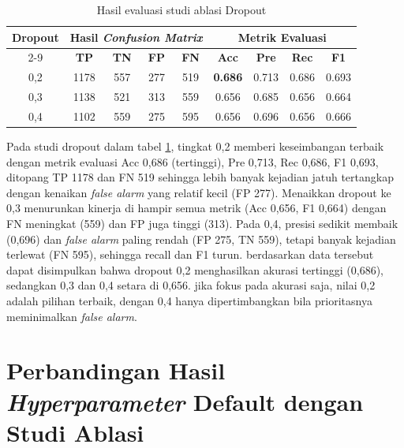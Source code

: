 \begin{table}[htbp]
    \centering
    \caption{Hasil evaluasi studi ablasi Dropout}
    \label{tab:ablasi Dropout}
    \begin{tabular}{|c|c|c|c|c|c|c|c|c|}
        \hline
        \multirow{2}{*}{\textbf{Dropout}} & \multicolumn{4}{c|}{\textbf{Hasil \textit{Confusion Matrix}}} & \multicolumn{4}{c|}{\textbf{Metrik Evaluasi}} \\ \cline{2-9}
         & \textbf{TP} & \textbf{TN} & \textbf{FP} & \textbf{FN} & \textbf{Acc} & \textbf{Pre} & \textbf{Rec} & \textbf{F1} \\ \hline
        0,2 & 1178 & 557 & 277 & 519 & \textbf{0.686} & 0.713 & 0.686 & 0.693 \\ \hline
        0,3 & 1138  & 521 & 313 & 559 & 0.656 & 0.685 & 0.656 & 0.664 \\ \hline
        0,4 & 1102 & 559 & 275 & 595 & 0.656 & 0.696 & 0.656 & 0.666 \\ \hline
    \end{tabular}
\end{table}

Pada studi dropout dalam tabel \ref{tab:ablasi Dropout}, tingkat 0,2 memberi keseimbangan terbaik dengan metrik evaluasi Acc 0,686 (tertinggi), Pre 0,713, Rec 0,686, F1 0,693, ditopang TP 1178 dan FN 519 sehingga lebih banyak kejadian jatuh tertangkap dengan kenaikan \textit{false alarm} yang relatif kecil (FP 277). Menaikkan dropout ke 0,3 menurunkan kinerja di hampir semua metrik (Acc 0,656, F1 0,664) dengan FN meningkat (559) dan FP juga tinggi (313). Pada 0,4, presisi sedikit membaik (0,696) dan \textit{false alarm} paling rendah (FP 275, TN 559), tetapi banyak kejadian terlewat (FN 595), sehingga recall dan F1 turun. berdasarkan data tersebut dapat disimpulkan bahwa dropout 0,2 menghasilkan akurasi tertinggi (0,686), sedangkan 0,3 dan 0,4 setara di 0,656. jika fokus pada akurasi saja, nilai 0,2 adalah pilihan terbaik, dengan 0,4 hanya dipertimbangkan bila prioritasnya meminimalkan \textit{false alarm}.


\section{Perbandingan Hasil \textit{Hyperparameter} Default dengan Studi Ablasi} \label{IV.Analisis}


